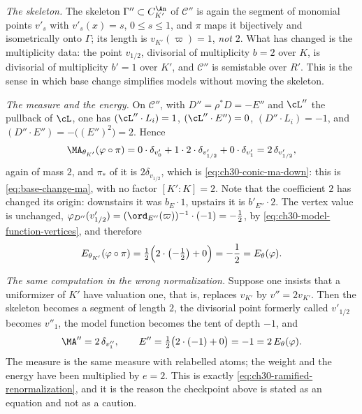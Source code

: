 \begin{example}
\emph{The skeleton.}  The skeleton $\Gamma''\subset C_{K'}^{\An}$ of
$\mathcal C''$ is again the segment of monomial points $v'_s$ with
$v'_s(x)=s$, $0\leq s\leq1$, and $\pi$ maps it bijectively and
isometrically onto $\Gamma$; its length is $v_{K'}(\varpi)=1$,
\emph{not} $2$.  What has changed is the multiplicity data: the point
$v_{1/2}$, divisorial of multiplicity $b=2$ over $K$, is divisorial of
multiplicity $b'=1$ over $K'$, and $\mathcal C''$ is semistable over $R'$.
This is the sense in which base change simplifies models without moving the
skeleton.

\emph{The measure and the energy.}  On $\mathcal C''$, with
$D''=\rho^*D=-E''$ and $\cL''$ the pullback of $\cL$, one has
$(\cL''\cdot L_i)=1$, $(\cL''\cdot E'')=0$, $(D''\cdot L_i)=-1$, and
$(D''\cdot E'')=-\bigl((E'')^2\bigr)=2$.  Hence
\begin{equation}
\label{eq:ch30-conic-ma-up}
 \MA_{\theta_{K'}}(\varphi\circ\pi)
 =0\cdot\delta_{v'_0}+1\cdot 2\cdot\delta_{v'_{1/2}}+0\cdot\delta_{v'_1}
 =2\,\delta_{v'_{1/2}},
\end{equation}
again of mass $2$, and $\pi_*$ of it is $2\delta_{v_{1/2}}$, which is
\eqref{eq:ch30-conic-ma-down}: this is \eqref{eq:base-change-ma}, with no
factor $[K':K]=2$.  Note that the coefficient $2$ has changed its
origin: downstairs it was $b_E\cdot1$, upstairs it is
$b'_{E''}\cdot2$.  The vertex value is unchanged,
$\varphi_{D''}(v'_{1/2})=(\ord_{E''}(\varpi))^{-1}\cdot(-1)=-\tfrac12$,
by \eqref{eq:ch30-model-function-vertices}, and therefore
\begin{equation}
\label{eq:ch30-conic-energy-up}
 E_{\theta_{K'}}(\varphi\circ\pi)
 =\tfrac12\Bigl(2\cdot\bigl(-\tfrac12\bigr)+0\Bigr)=-\frac12
 =E_\theta(\varphi).
\end{equation}

\emph{The same computation in the wrong normalization.}  Suppose one
insists that a uniformizer of $K'$ have valuation one, that is, replaces
$v_{K'}$ by $v''=2v_{K'}$.  Then the skeleton becomes a segment of
length $2$, the divisorial point formerly called $v'_{1/2}$ becomes
$v''_1$, the model function becomes the tent of depth $-1$, and
\[
 \MA''=2\,\delta_{v''_1},
 \qquad
 E''=\tfrac12\bigl(2\cdot(-1)+0\bigr)=-1=2\,E_\theta(\varphi).
\]
The measure is the same measure with relabelled atoms; the weight and the
energy have been multiplied by $e=2$.  This is exactly
\eqref{eq:ch30-ramified-renormalization}, and it is the reason the
checkpoint above is stated as an equation and not as a caution.
\end{example}

